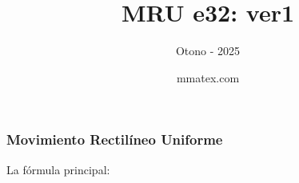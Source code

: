 \documentclass{beamer}
\title{MRU e32: ver1}
\subtitle{Otono - 2025}
\author{mmatex.com}
\begin{document}
\maketitle

\begin{frame}
\frametitle{Movimiento Rectil\'ineo Uniforme}
% 
 La f\'ormula principal:

                                                               
 
{\huge \vmru}
\vNUa
                                                               
                                                               
                                                               
                                                               
\end{frame}
\end{document}
